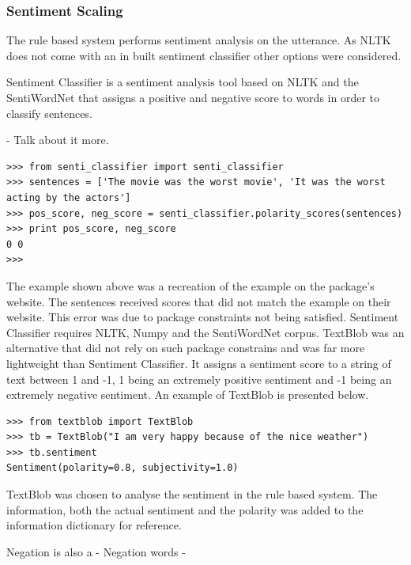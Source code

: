 \documentclass[bsc,frontabs,twoside,singlespacing,parskip]{infthesis}
\begin{document}
%	

\subsubsection{Sentiment Scaling}

The rule based system performs sentiment analysis on the utterance. As NLTK does not come with an in built sentiment classifier other options were considered. 

Sentiment Classifier \cite{senti_class} is a sentiment analysis tool based on NLTK and the SentiWordNet that assigns a positive and negative score to words in order to classify sentences.

- Talk about it more.

\begin{lstlisting}
>>> from senti_classifier import senti_classifier
>>> sentences = ['The movie was the worst movie', 'It was the worst acting by the actors']
>>> pos_score, neg_score = senti_classifier.polarity_scores(sentences)
>>> print pos_score, neg_score
0 0
>>> 
\end{lstlisting}
The example shown above was a recreation of the example on the package's website. The sentences received scores that did not match the example on their website. This error was due to package constraints not being satisfied. Sentiment Classifier requires NLTK, Numpy and the SentiWordNet corpus. TextBlob \cite{textblob} was an alternative that did not rely on such package constrains and was far more lightweight than Sentiment Classifier. It assigns a sentiment score to a string of text between 1 and -1, 1 being an extremely positive sentiment and -1 being an extremely negative sentiment. An example of TextBlob is presented below.

\begin{lstlisting}
>>> from textblob import TextBlob
>>> tb = TextBlob("I am very happy because of the nice weather")
>>> tb.sentiment
Sentiment(polarity=0.8, subjectivity=1.0)
\end{lstlisting}

TextBlob was chosen to analyse the sentiment in the rule based system. The information, both the actual sentiment and the polarity was added to the information dictionary for reference.

Negation is also a 
- Negation words - \cite{neg_corpus} \cite{negation_corpus_1} \cite{negation_corpus_2}
\end{document}
